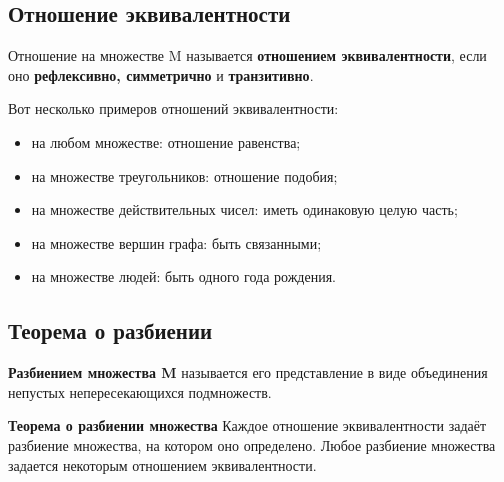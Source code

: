\documentclass[a4paper]{article}
\begin{document}
    \subsection*{Отношение эквивалентности
    }
    Отношение на множестве M называется \textbf{отношением
    эквивалентности}, если оно \textbf{рефлексивно, симметрично} и \textbf{транзитивно}.

    Вот несколько примеров отношений эквивалентности:
    \begin{itemize}
        \item на любом множестве: отношение равенства;
        \item на множестве треугольников: отношение подобия;
        \item на множестве действительных чисел: иметь одинаковую целую часть;
        \item на множестве вершин графа: быть связанными;
        \item на множестве людей: быть одного года рождения.
    \end{itemize}


    \subsection*{Теорема о разбиении}
    \begin{definit}
        \textbf{Разбиением множества M} называется его представление в виде объединения непустых непересекающихся подмножеств.
    \end{definit}

    \begin{htheorem}
        \textbf{Теорема о разбиении множества}
        Каждое отношение эквивалентности
        задаёт разбиение множества, на котором оно определено. Любое разбиение множества задается некоторым отношением эквивалентности.
    \end{htheorem}
\end{document}
